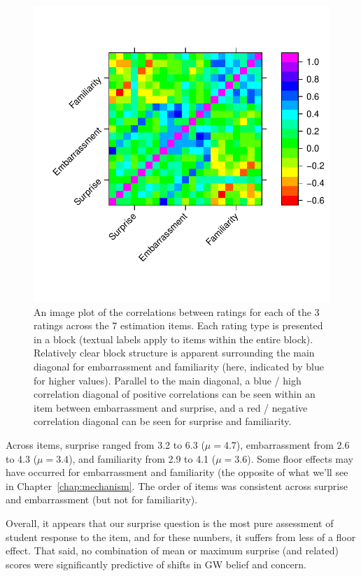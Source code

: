 \begin{figure}
    \centering
    \includegraphics{CCO-prondi-surp-corr.pdf}
    \caption{An image plot of the correlations between ratings for each of the 3
        ratings across the 7 estimation items. Each rating type is presented in
        a block (textual labels apply to items within the entire block).
        Relatively clear block structure is apparent surrounding the main
        diagonal for embarrassment and familiarity (here, indicated by blue for
        higher values). Parallel to the main diagonal, a blue / high correlation
        diagonal of positive correlations can be seen within an item between
        embarrassment and surprise, and a red / negative correlation diagonal
        can be seen for surprise and familiarity.}
    \label{fig:CCO-prondi-surp-corr}
\end{figure}

Across items, surprise ranged from 3.2 to 6.3 ($\mu=4.7$), embarrassment from
2.6 to 4.3 ($\mu=3.4$), and familiarity from 2.9 to 4.1 ($\mu=3.6$). Some floor
effects may have occurred for embarrassment and familiarity (the opposite of
what we'll see in Chapter~\ref{chap:mechanism}. The order of items was
consistent across surprise and embarrassment (but not for familiarity). 

Overall, it appears that our surprise question is the most pure assessment of
student response to the item, and for these numbers, it suffers from less of a
floor effect. That said, no combination of mean or maximum surprise (and
related) scores were significantly predictive of shifts in GW belief and
concern.

